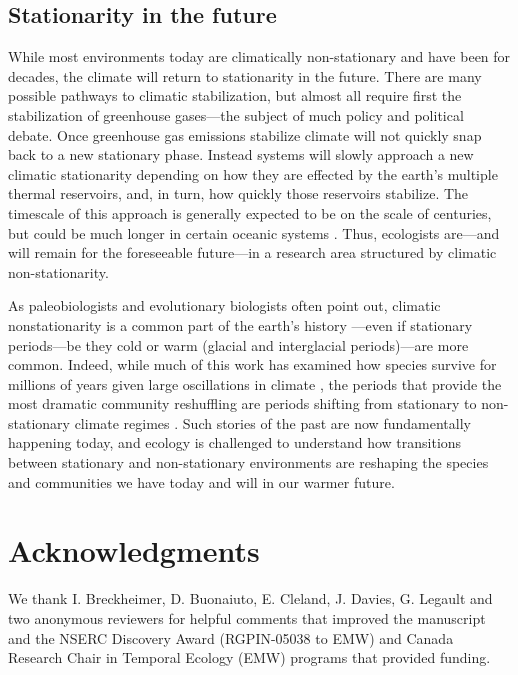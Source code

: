 \documentclass[11pt,letterpaper]{article}
\begin{document}
\subsection{Stationarity in the future}

While most environments today are climatically non-stationary and have been for decades, the climate will return to stationarity in the future. There are many possible pathways to climatic stabilization, but almost all require first the stabilization of greenhouse gases---the subject of much policy and political debate. Once greenhouse gas emissions stabilize climate will not quickly snap back to a new stationary phase. Instead systems will slowly approach a new climatic stationarity depending on how they are effected by the earth's multiple thermal reservoirs, and, in turn, how quickly those reservoirs stabilize. The timescale of this approach is generally expected to be on the scale of centuries, but could be much longer in certain oceanic systems \citep{ipcc2013ch12}. Thus, ecologists are---and will remain for the foreseeable future---in a research area structured by climatic non-stationarity. 

As paleobiologists and evolutionary biologists often point out, climatic nonstationarity is a common part of the earth's history \citep{Jansson:2002nz}---even if stationary periods---be they cold or warm (glacial and interglacial periods)---are more common. Indeed, while much of this work has examined how species survive for millions of years given large oscillations in climate \citep{provan2008}, the periods that provide the most dramatic community reshuffling are periods shifting from stationary to non-stationary climate regimes \citep{vrba1980,vrba1985}. Such stories of the past are now fundamentally happening today, and ecology is challenged to understand how transitions between stationary and non-stationary environments are reshaping the species and communities we have today and will in our warmer future. 

\section{Acknowledgments}
We thank I. Breckheimer, D. Buonaiuto, E. Cleland, J. Davies, G. Legault and two anonymous reviewers for helpful comments that improved the manuscript and the NSERC Discovery Award (RGPIN-05038 to EMW) and Canada Research Chair in Temporal Ecology (EMW) programs that provided funding. 

\end{document}
